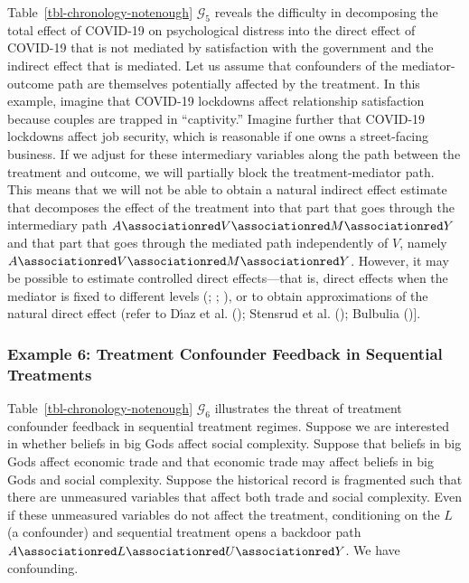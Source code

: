 \documentclass[
  single column]{article}
\begin{document}
Table~\ref{tbl-chronology-notenough} \(\mathcal{G}_5\) reveals the
difficulty in decomposing the total effect of COVID-19 on psychological
distress into the direct effect of COVID-19 that is not mediated by
satisfaction with the government and the indirect effect that is
mediated. Let us assume that confounders of the mediator-outcome path
are themselves potentially affected by the treatment. In this example,
imagine that COVID-19 lockdowns affect relationship satisfaction because
couples are trapped in ``captivity.'' Imagine further that COVID-19
lockdowns affect job security, which is reasonable if one owns a
street-facing business. If we adjust for these intermediary variables
along the path between the treatment and outcome, we will partially
block the treatment-mediator path. This means that we will not be able
to obtain a natural indirect effect estimate that decomposes the effect
of the treatment into that part that goes through the intermediary path
\(A \associationred V \associationred M \associationred Y\) and that
part that goes through the mediated path independently of \(V\), namely
\(A \associationred V \associationred M \associationred Y\). However, it
may be possible to estimate controlled direct effects---that is, direct
effects when the mediator is fixed to different levels
(;
;
), or to obtain
approximations of the natural direct effect (refer to Dı́az et al.
(); Stensrud et al.
(); Bulbulia
(){]}.

\subsubsection{Example 6: Treatment Confounder Feedback in Sequential
Treatments}\label{example-6-treatment-confounder-feedback-in-sequential-treatments}

Table~\ref{tbl-chronology-notenough} \(\mathcal{G}_6\) illustrates the
threat of treatment confounder feedback in sequential treatment regimes.
Suppose we are interested in whether beliefs in big Gods affect social
complexity. Suppose that beliefs in big Gods affect economic trade and
that economic trade may affect beliefs in big Gods and social
complexity. Suppose the historical record is fragmented such that there
are unmeasured variables that affect both trade and social complexity.
Even if these unmeasured variables do not affect the treatment,
conditioning on the \(L\) (a confounder) and sequential treatment opens
a backdoor path
\(A \associationred L \associationred U \associationred Y\). We have
confounding.
\end{document}

